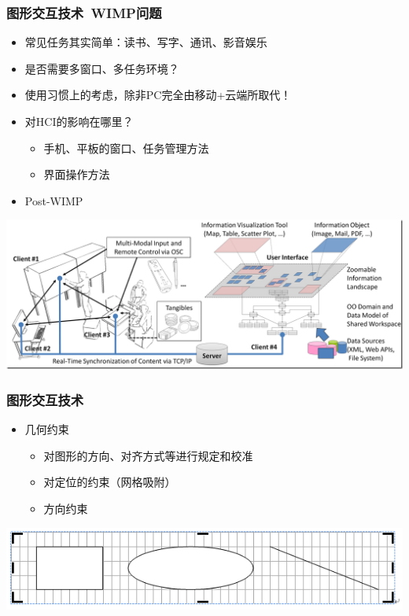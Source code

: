 \documentclass{beamer}
\begin{document}
\begin{frame}
	\frametitle{图形交互技术~{\small WIMP问题}}
	\beamertemplatetransparentcovereddynamicmedium
	\begin{itemize}[<+->]
		\item 常见任务其实简单：读书、写字、通讯、影音娱乐 %
		\item 是否需要多窗口、多任务环境？
		\item 使用习惯上的考虑，除非PC完全由移动+云端所取代！
		\item 对HCI的影响在哪里？
		\begin{itemize}
			\item 手机、平板的窗口、任务管理方法
			\item 界面操作方法
		\end{itemize}
		\item Post-WIMP
	\end{itemize}
	\begin{center}
	\includegraphics[width=.7\textwidth]{images/post-wimp.png}
	\end{center}
\end{frame}

\begin{frame}
	\frametitle{图形交互技术}
	\begin{itemize}
		\item 几何约束
		\begin{itemize}
			\item 对图形的方向、对齐方式等进行规定和校准
			\item 对定位的约束（网格吸附）
			\item 方向约束
		\end{itemize}
	\end{itemize}
	\begin{center}
	\includegraphics[width=.9\textwidth]{images/grid-word.png}
	\end{center}
\end{frame}
\end{document}
